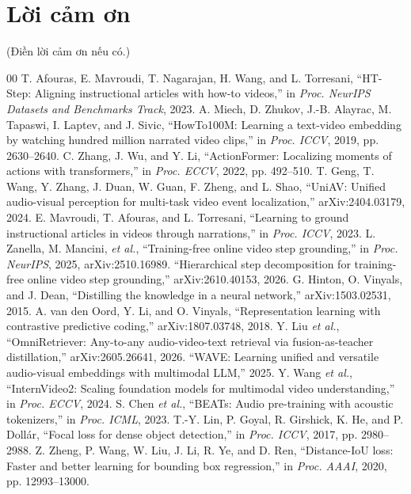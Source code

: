 \documentclass{IEEEtran}
\begin{document}
\section*{Lời cảm ơn}
(Điền lời cảm ơn nếu có.)

\begin{thebibliography}{00}
 T. Afouras, E. Mavroudi, T. Nagarajan, H. Wang, and L. Torresani, ``HT-Step: Aligning instructional articles with how-to videos,'' in \textit{Proc. NeurIPS Datasets and Benchmarks Track}, 2023.
 A. Miech, D. Zhukov, J.-B. Alayrac, M. Tapaswi, I. Laptev, and J. Sivic, ``HowTo100M: Learning a text-video embedding by watching hundred million narrated video clips,'' in \textit{Proc. ICCV}, 2019, pp. 2630--2640.
 C. Zhang, J. Wu, and Y. Li, ``ActionFormer: Localizing moments of actions with transformers,'' in \textit{Proc. ECCV}, 2022, pp. 492--510.
 T. Geng, T. Wang, Y. Zhang, J. Duan, W. Guan, F. Zheng, and L. Shao, ``UniAV: Unified audio-visual perception for multi-task video event localization,'' arXiv:2404.03179, 2024.
 E. Mavroudi, T. Afouras, and L. Torresani, ``Learning to ground instructional articles in videos through narrations,'' in \textit{Proc. ICCV}, 2023.
 L. Zanella, M. Mancini, \textit{et al.}, ``Training-free online video step grounding,'' in \textit{Proc. NeurIPS}, 2025, arXiv:2510.16989.
 ``Hierarchical step decomposition for training-free online video step grounding,'' arXiv:2610.40153, 2026.
 G. Hinton, O. Vinyals, and J. Dean, ``Distilling the knowledge in a neural network,'' arXiv:1503.02531, 2015.
 A. van den Oord, Y. Li, and O. Vinyals, ``Representation learning with contrastive predictive coding,'' arXiv:1807.03748, 2018.
 Y. Liu \textit{et al.}, ``OmniRetriever: Any-to-any audio-video-text retrieval via fusion-as-teacher distillation,'' arXiv:2605.26641, 2026.
 ``WAVE: Learning unified and versatile audio-visual embeddings with multimodal LLM,'' 2025.
 Y. Wang \textit{et al.}, ``InternVideo2: Scaling foundation models for multimodal video understanding,'' in \textit{Proc. ECCV}, 2024.
 S. Chen \textit{et al.}, ``BEATs: Audio pre-training with acoustic tokenizers,'' in \textit{Proc. ICML}, 2023.
 T.-Y. Lin, P. Goyal, R. Girshick, K. He, and P. Dollár, ``Focal loss for dense object detection,'' in \textit{Proc. ICCV}, 2017, pp. 2980--2988.
 Z. Zheng, P. Wang, W. Liu, J. Li, R. Ye, and D. Ren, ``Distance-IoU loss: Faster and better learning for bounding box regression,'' in \textit{Proc. AAAI}, 2020, pp. 12993--13000.

\end{thebibliography}
\end{document}

